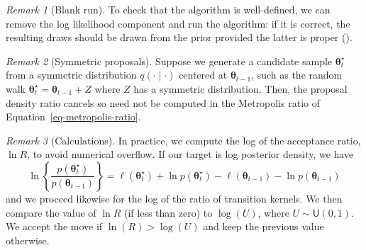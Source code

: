 \documentclass[
  11pt,
  letterpaper,
]{scrbook}
\theoremstyle{definition}
\theoremstyle{plain}
\theoremstyle{plain}
\theoremstyle{definition}
\theoremstyle{definition}
\theoremstyle{remark}
\newtheorem*{remark}{Remark}
\begin{document}
\begin{remark}[Blank run]
To check that the algorithm is well-defined, we can remove the log
likelihood component and run the algorithm: if it is correct, the
resulting draws should be drawn from the prior provided the latter is
proper ().
\end{remark}

\begin{remark}[Symmetric proposals]
Suppose we generate a candidate sample \(\boldsymbol{\theta}_t^{\star}\)
from a symmetric distribution \(q(\cdot \mid \cdot)\) centered at
\(\boldsymbol{\theta}_{t-1}\), such as the random walk
\(\boldsymbol{\theta}_t^{\star} =\boldsymbol{\theta}_{t-1}+ Z\) where
\(Z\) has a symmetric distribution. Then, the proposal density ratio
cancels so need not be computed in the Metropolis ratio of
Equation~\ref{eq-metropolis-ratio}.
\end{remark}

\begin{remark}[Calculations]
In practice, we compute the log of the acceptance ratio, \(\ln R\), to
avoid numerical overflow. If our target is log posterior density, we
have \[
\ln \left\{\frac{p(\boldsymbol{\theta}_t^{\star})}{p(\boldsymbol{\theta}_{t-1})}\right\} = \ell(\boldsymbol{\theta}_t^{\star}) + \ln p(\boldsymbol{\theta}_t^{\star}) - \ell(\boldsymbol{\theta}_{t-1}) - \ln p(\boldsymbol{\theta}_{t-1}) 
\] and we proceed likewise for the log of the ratio of transition
kernels. We then compare the value of \(\ln R\) (if less than zero) to
\(\log(U)\), where \(U \sim \mathsf{U}(0,1)\). We accept the move if
\(\ln(R) >\log(U)\) and keep the previous value otherwise.
\end{remark}
\end{document}
